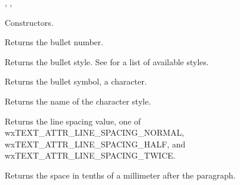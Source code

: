 
, , 



\label{wxtextattrexwxtextattrex}




Constructors.

\label{wxtextattrexgetbulletnumber}


Returns the bullet number.

\label{wxtextattrexgetbulletstyle}


Returns the bullet style.
See  for a list of available styles.

\label{wxtextattrexgetbulletsymbol}


Returns the bullet symbol, a character.

\label{wxtextattrexgetcharacterstylename}


Returns the name of the character style.

\label{wxtextattrexgetlinespacing}


Returns the line spacing value, one of wxTEXT\_ATTR\_LINE\_SPACING\_NORMAL,
wxTEXT\_ATTR\_LINE\_SPACING\_HALF, and wxTEXT\_ATTR\_LINE\_SPACING\_TWICE.

\label{wxtextattrexgetparagraphspacingafter}


Returns the space in tenths of a millimeter after the paragraph.

